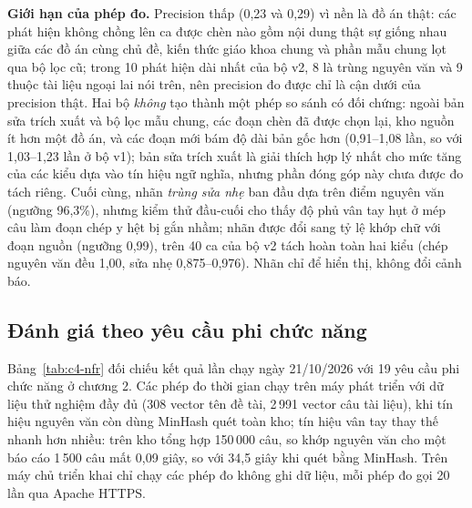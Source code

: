 \documentclass[../main.tex]{subfiles}
\begin{document}
\textbf{Giới hạn của phép đo.} Precision thấp (0,23 và 0,29) vì nền là đồ án thật: các phát hiện không chồng lên ca được chèn nào gồm nội dung thật sự giống nhau giữa các đồ án cùng chủ đề, kiến thức giáo khoa chung và phần mẫu chung lọt qua bộ lọc cũ; trong 10 phát hiện dài nhất của bộ v2, 8 là trùng nguyên văn và 9 thuộc tài liệu ngoại lai nói trên, nên precision đo được chỉ là cận dưới của precision thật. Hai bộ \textit{không} tạo thành một phép so sánh có đối chứng: ngoài bản sửa trích xuất và bộ lọc mẫu chung, các đoạn chèn đã được chọn lại, kho nguồn ít hơn một đồ án, và các đoạn  mới bám độ dài bản gốc hơn (0,91--1,08 lần, so với 1,03--1,23 lần ở bộ v1); bản sửa trích xuất là giải thích hợp lý nhất cho mức tăng của các kiểu dựa vào tín hiệu ngữ nghĩa, nhưng phần đóng góp này chưa được đo tách riêng. Cuối cùng, nhãn \textit{trùng sửa nhẹ} ban đầu dựa trên điểm nguyên văn (ngưỡng 96,3\%), nhưng kiểm thử đầu-cuối cho thấy độ phủ vân tay hụt ở mép câu làm đoạn chép y hệt bị gắn nhầm; nhãn được đổi sang tỷ lệ khớp chữ với đoạn nguồn (ngưỡng 0,99), trên 40 ca của bộ v2 tách hoàn toàn hai kiểu (chép nguyên văn đều 1,00, sửa nhẹ 0,875--0,976). Nhãn chỉ để hiển thị, không đổi cảnh báo.

\subsection{Đánh giá theo yêu cầu phi chức năng}

Bảng~\ref{tab:c4-nfr} đối chiếu kết quả lần chạy ngày 21/10/2026 với 19 yêu cầu phi chức năng ở chương 2. Các phép đo thời gian chạy trên máy phát triển với dữ liệu thử nghiệm đầy đủ (308 vector tên đề tài, 2\,991 vector câu tài liệu), khi tín hiệu nguyên văn còn dùng MinHash quét toàn kho; tín hiệu vân tay thay thế nhanh hơn nhiều: trên kho tổng hợp 150\,000 câu, so khớp nguyên văn cho một báo cáo 1\,500 câu mất 0,09 giây, so với 34,5 giây khi quét bằng MinHash. Trên máy chủ triển khai chỉ chạy các phép đo không ghi dữ liệu, mỗi phép đo gọi 20 lần qua Apache HTTPS.
\end{document}
